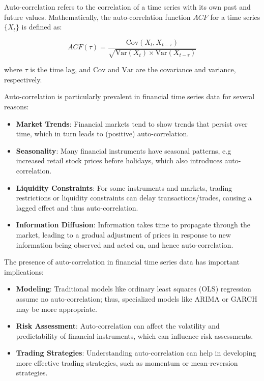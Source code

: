 \documentclass[12pt, twoside,hidelinks]{article}
\theoremstyle{definition}
\numberwithin{equation}{section}
\begin{document}
Auto-correlation refers to the correlation of a time series with its own past and future values. Mathematically, the auto-correlation function \(ACF\) for a time series \( \{X_t\} \) is defined as:

\[
ACF(\tau) = \frac{\text{Cov}(X_t, X_{t-\tau})}{\sqrt{\text{Var}(X_t) \times \text{Var}(X_{t-\tau})}}
\]

where \( \tau \) is the time lag, and \( \text{Cov} \) and \( \text{Var} \) are the covariance and variance, respectively.
\newline

Auto-correlation is particularly prevalent in financial time series data for several reasons:

\begin{itemize}
    \item \textbf{Market Trends}: Financial markets tend to show trends that persist over time, which in turn leads to (positive) auto-correlation.
    \item \textbf{Seasonality}: Many financial instruments have seasonal patterns, e.g increased retail stock prices before holidays, which also introduces auto-correlation.
    \item \textbf{Liquidity Constraints}: For some instruments and markets, trading restrictions or liquidity constraints can delay transactions/trades, causing a lagged effect and thus auto-correlation.
    \item \textbf{Information Diffusion}: Information takes time to propagate through the market, leading to a gradual adjustment of prices in response to new information being observed and acted on, and hence auto-correlation.
\end{itemize}

The presence of auto-correlation in financial time series data has important implications:

\begin{itemize}
    \item \textbf{Modeling}: Traditional models like ordinary least squares (OLS) regression assume no auto-correlation; thus, specialized models like ARIMA or GARCH may be more appropriate.
    \item \textbf{Risk Assessment}: Auto-correlation can affect the volatility and predictability of financial instruments, which can influence risk assessments.
    \item \textbf{Trading Strategies}: Understanding auto-correlation can help in developing more effective trading strategies, such as momentum or mean-reversion strategies.
\end{itemize}
\end{document}
